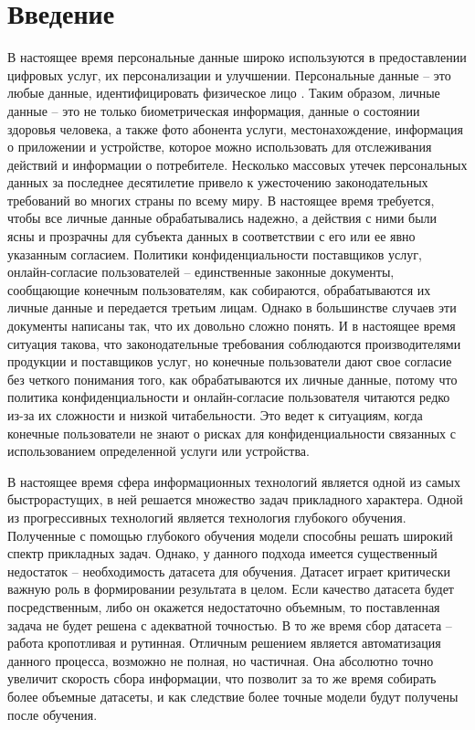 \documentclass[../main]{subfiles}
\begin{document}
\newpage
{}
{}
\section*{Введение}

В настоящее время персональные данные широко используются в предоставлении цифровых услуг, их персонализации и улучшении. Персональные данные -- это любые данные, идентифицировать физическое лицо \cite{GDPR}. Таким образом, личные данные -- это не только биометрическая информация, данные о состоянии здоровья человека, а также фото абонента услуги, местонахождение, информация о приложении и устройстве, которое можно использовать для отслеживания действий и информации о потребителе. Несколько массовых утечек персональных данных за последнее десятилетие привело к ужесточению законодательных требований во многих страны по всему миру. В настоящее время требуется, чтобы все личные данные обрабатывались надежно, а действия с ними были ясны и прозрачны для субъекта данных в соответствии с его или ее явно указанным согласием. Политики конфиденциальности поставщиков услуг, онлайн-согласие пользователей -- единственные законные документы, сообщающие конечным пользователям, как собираются, обрабатываются их личные данные и передается третьим лицам. Однако в большинстве случаев эти документы написаны так, что их довольно сложно понять. И в настоящее время ситуация такова, что законодательные требования  соблюдаются производителями продукции и поставщиков услуг, но конечные пользователи дают свое согласие без четкого понимания того, как обрабатываются их личные данные, потому что политика конфиденциальности и онлайн-согласие пользователя читаются редко из-за их сложности и низкой читабельности. Это ведет к ситуациям, когда конечные пользователи не знают о рисках для конфиденциальности связанных с использованием определенной услуги или устройства. 

В настоящее время сфера информационных технологий является одной из самых быстрорастущих, в ней решается множество задач прикладного характера. Одной из прогрессивных технологий является технология глубокого обучения. Полученные с помощью глубокого обучения модели способны решать широкий спектр прикладных задач. Однако, у данного подхода имеется существенный недостаток -- необходимость датасета для обучения. Датасет играет критически важную роль в формировании результата в целом. Если качество датасета будет посредственным, либо он окажется недостаточно объемным, то поставленная задача не будет решена с адекватной точностью. В то же время сбор датасета -- работа кропотливая и рутинная. Отличным решением является автоматизация данного процесса, возможно не полная, но частичная. Она абсолютно точно увеличит скорость сбора информации, что позволит за то же время собирать более объемные датасеты, и как следствие более точные модели будут получены после обучения.
\end{document}
